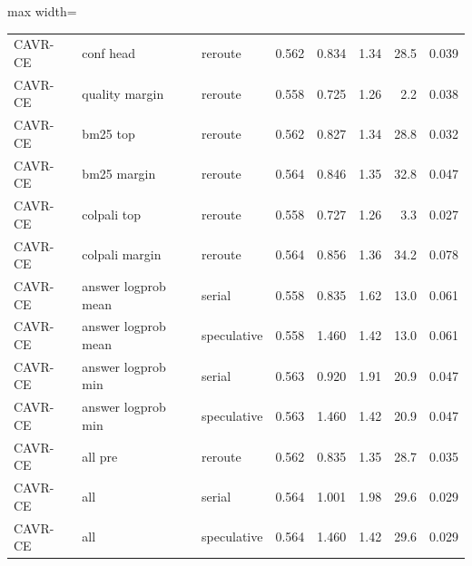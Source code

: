 \begin{table}[t]
\begin{adjustbox}{max width=\linewidth}
\begin{tabular}{lllrrrrr}
CAVR-CE & conf head & reroute & 0.562 & 0.834 & 1.34 & 28.5 & 0.039 \\
CAVR-CE & quality margin & reroute & 0.558 & 0.725 & 1.26 & 2.2 & 0.038 \\
CAVR-CE & bm25 top & reroute & 0.562 & 0.827 & 1.34 & 28.8 & 0.032 \\
CAVR-CE & bm25 margin & reroute & 0.564 & 0.846 & 1.35 & 32.8 & 0.047 \\
CAVR-CE & colpali top & reroute & 0.558 & 0.727 & 1.26 & 3.3 & 0.027 \\
CAVR-CE & colpali margin & reroute & 0.564 & 0.856 & 1.36 & 34.2 & 0.078 \\
CAVR-CE & answer logprob mean & serial & 0.558 & 0.835 & 1.62 & 13.0 & 0.061 \\
CAVR-CE & answer logprob mean & speculative & 0.558 & 1.460 & 1.42 & 13.0 & 0.061 \\
CAVR-CE & answer logprob min & serial & 0.563 & 0.920 & 1.91 & 20.9 & 0.047 \\
CAVR-CE & answer logprob min & speculative & 0.563 & 1.460 & 1.42 & 20.9 & 0.047 \\
CAVR-CE & all pre & reroute & 0.562 & 0.835 & 1.35 & 28.7 & 0.035 \\
CAVR-CE & all & serial & 0.564 & 1.001 & 1.98 & 29.6 & 0.029 \\
CAVR-CE & all & speculative & 0.564 & 1.460 & 1.42 & 29.6 & 0.029 \\
\bottomrule
\end{tabular}
\end{adjustbox}
\end{table}

